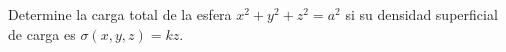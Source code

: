 Determine la carga total de la esfera $x^2+y^2+z^2=a^2$ si su densidad superficial de carga es $\sigma(x,y,z)=kz$.
